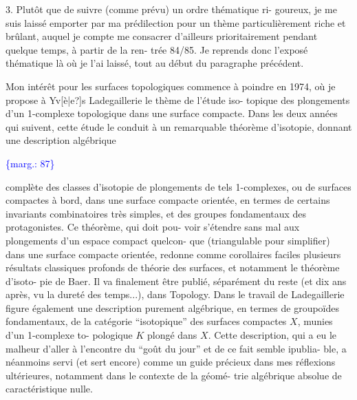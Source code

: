 \documentclass[11pt]{article}
\newcommand{\scanpage}[1]{\par\bigskip\noindent{\small\sffamily[scan #1]}\par}
\newcommand{\mspage}[1]{{\small\sffamily[p.\,#1]}}
\let\over\relax
\newcommand{\over}[2]{\textcolor{gray}{#1}\textcolor{blue}{\ensuremath{^{\!\nearrow}}#2}}
\newcommand{\margin}[1]{\textcolor{blue}{\{\textsf{marg.:} #1\}}}
\newcommand{\unsure}[1]{[#1?]}
\begin{document}
3. Plutôt que de suivre (comme prévu) un ordre thématique ri-%
goureux, je me suis laissé emporter par ma prédilection pour un thème
particulièrement riche et brûlant, auquel je compte me consacrer
d'ailleurs prioritairement pendant quelque temps, à partir de la ren-%
trée 84/85. Je reprends donc l'exposé thématique là où je l'ai laissé,
tout au début du paragraphe précédent.

Mon intérêt pour les surfaces topologiques commence à poindre
en 1974, où je propose à Yv\unsure{è|e}s Ladegaillerie le thème de l'étude iso-%
topique des plongements d'un 1-complexe topologique dans une surface
compacte. Dans les deux années qui suivent, cette étude le conduit à
un remarquable théorème d'isotopie, donnant une description algébrique

\margin{87}

\clearpage
\scanpage{119/88}
\mspage{10}

complète des classes d'isotopie de plongements de tels 1-complexes,
ou de surfaces compactes à bord, dans une surface compacte orientée,
en termes de certains invariants combinatoires très simples, et des
groupes fondamentaux des protagonistes. Ce théorème, qui doit pou-%
voir s'étendre sans mal aux plongements d'un espace compact quelcon-%
que (triangulable pour simplifier) dans une surface compacte orientée,
redonne comme corollaires faciles plusieurs résultats classiques
profonds de théorie des surfaces, et notamment le théorème d'isoto-%
pie de Baer. Il va finalement être publié, séparément du reste (et
dix ans après, vu la dureté des temps...), dans Topology. Dans le
travail de Ladegaillerie figure également une description purement
algébrique, en termes de groupoïdes fondamentaux, de la catégorie
``isotopique'' des surfaces compactes $X$, munies d'un 1-complexe to-%
pologique $K$ plongé dans $X$. Cette description, qui a eu le malheur
d'aller à l'encontre du ``goût du jour'' et de ce fait semble i\over{m}{n}publia-%
ble, a néanmoins servi (et sert encore) comme un guide précieux dans
mes réflexions ultérieures, notamment dans le contexte de la géomé-%
trie algébrique absolue de caractéristique nulle.
\end{document}
